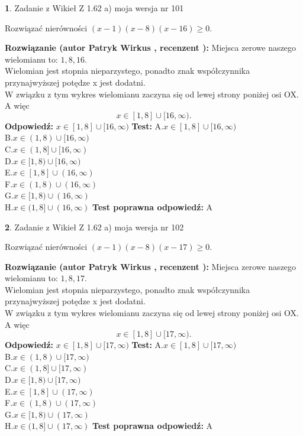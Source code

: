 \documentclass[12pt, a4paper]{article}
\theoremstyle{definition} %
\newtheorem{zad}{}
\newcommand{\zadStart}[1]{\begin{zad}#1\newline}
\newcommand{\zadStop}{\end{zad}}
\newcommand{\rozwStart}[2]{\noindent \textbf{Rozwiązanie (autor #1 , recenzent #2): }\newline}
\newcommand{\rozwStop}{\newline}
\newcommand{\odpStart}{\noindent \textbf{Odpowiedź:}\newline}
\newcommand{\odpStop}{\newline}
\newcommand{\testStart}{\noindent \textbf{Test:}\newline}
\newcommand{\testStop}{\newline}
\newcommand{\kluczStart}{\noindent \textbf{Test poprawna odpowiedź:}\newline}
\newcommand{\kluczStop}{\newline}
\begin{document}
\zadStart{Zadanie z Wikieł Z 1.62 a) moja wersja nr 101}

Rozwiązać nierówności $(x-1)(x-8)(x-16)\ge0$.
\zadStop
\rozwStart{Patryk Wirkus}{}
Miejsca zerowe naszego wielomianu to: $1, 8, 16$.\\
Wielomian jest stopnia nieparzystego, ponadto znak współczynnika przy\linebreak najwyższej potędze x jest dodatni.\\ W związku z tym wykres wielomianu zaczyna się od lewej strony poniżej osi OX. A więc $$x \in [1,8] \cup [16,\infty).$$
\rozwStop
\odpStart
$x \in [1,8] \cup [16,\infty)$
\odpStop
\testStart
A.$x \in [1,8] \cup [16,\infty)$\\
B.$x \in (1,8) \cup [16,\infty)$\\
C.$x \in (1,8] \cup [16,\infty)$\\
D.$x \in [1,8) \cup [16,\infty)$\\
E.$x \in [1,8] \cup (16,\infty)$\\
F.$x \in (1,8) \cup (16,\infty)$\\
G.$x \in [1,8) \cup (16,\infty)$\\
H.$x \in (1,8] \cup (16,\infty)$
\testStop
\kluczStart
A
\kluczStop



\zadStart{Zadanie z Wikieł Z 1.62 a) moja wersja nr 102}

Rozwiązać nierówności $(x-1)(x-8)(x-17)\ge0$.
\zadStop
\rozwStart{Patryk Wirkus}{}
Miejsca zerowe naszego wielomianu to: $1, 8, 17$.\\
Wielomian jest stopnia nieparzystego, ponadto znak współczynnika przy\linebreak najwyższej potędze x jest dodatni.\\ W związku z tym wykres wielomianu zaczyna się od lewej strony poniżej osi OX. A więc $$x \in [1,8] \cup [17,\infty).$$
\rozwStop
\odpStart
$x \in [1,8] \cup [17,\infty)$
\odpStop
\testStart
A.$x \in [1,8] \cup [17,\infty)$\\
B.$x \in (1,8) \cup [17,\infty)$\\
C.$x \in (1,8] \cup [17,\infty)$\\
D.$x \in [1,8) \cup [17,\infty)$\\
E.$x \in [1,8] \cup (17,\infty)$\\
F.$x \in (1,8) \cup (17,\infty)$\\
G.$x \in [1,8) \cup (17,\infty)$\\
H.$x \in (1,8] \cup (17,\infty)$
\testStop
\kluczStart
A
\kluczStop
\end{document}
